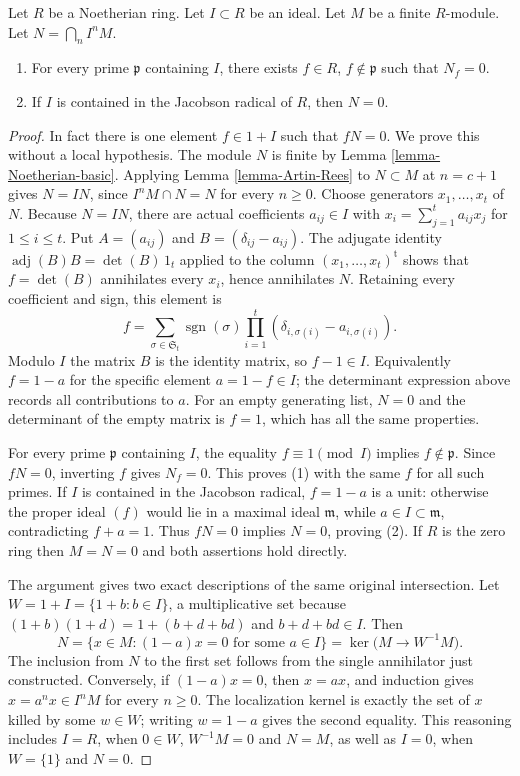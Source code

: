 \begin{lemma}
\label{lemma-intersection-powers-ideal-module}
Let $R$ be a Noetherian ring. Let $I \subset R$ be an ideal.
Let $M$ be a finite $R$-module. Let $N = \bigcap_n I^n M$.
\begin{enumerate}
\item For every prime $\mathfrak p$ containing $I$, there
exists $f \in R$, $f \not \in \mathfrak p$ such that $N_f = 0$.
\item If $I$ is contained in the Jacobson radical
of $R$, then $N = 0$.
\end{enumerate}
\end{lemma}

\begin{proof}
In fact there is one element $f\in1+I$ such that $fN=0$.
We prove this without a local hypothesis. The module $N$ is finite
by Lemma \ref{lemma-Noetherian-basic}. Applying
Lemma \ref{lemma-Artin-Rees} to $N\subset M$ at $n=c+1$
gives $N=IN$, since $I^nM\cap N=N$ for every $n\geq0$.
Choose generators $x_1,\ldots,x_t$ of $N$. Because $N=IN$,
there are actual coefficients $a_{ij}\in I$ with
$x_i=\sum_{j=1}^t a_{ij}x_j$ for $1\leq i\leq t$.
Put $A=(a_{ij})$ and $B=(\delta_{ij}-a_{ij})$.
The adjugate identity $\operatorname{adj}(B)B=\det(B)\,1_t$
applied to the column $(x_1,\ldots,x_t)^{\mathrm t}$ shows
that $f=\det(B)$ annihilates every $x_i$, hence annihilates $N$.
Retaining every coefficient and sign, this element is
$$
f=\sum_{\sigma\in\mathfrak S_t}\operatorname{sgn}(\sigma)
       \prod_{i=1}^t(\delta_{i,\sigma(i)}-a_{i,\sigma(i)}).
$$
Modulo $I$ the matrix $B$ is the identity matrix, so $f-1\in I$.
Equivalently $f=1-a$ for the specific element $a=1-f\in I$;
the determinant expression above records all contributions to $a$.
For an empty generating list, $N=0$ and the determinant of the
empty matrix is $f=1$, which has all the same properties.

For every prime $\mathfrak p$ containing $I$, the equality
$f\equiv1\pmod I$ implies $f\notin\mathfrak p$.
Since $fN=0$, inverting $f$ gives $N_f=0$. This proves (1)
with the same $f$ for all such primes. If $I$ is contained in the
Jacobson radical, $f=1-a$ is a unit: otherwise the proper ideal
$(f)$ would lie in a maximal ideal $\mathfrak m$, while
$a\in I\subset\mathfrak m$, contradicting $f+a=1$.
Thus $fN=0$ implies $N=0$, proving (2). If $R$ is the zero
ring then $M=N=0$ and both assertions hold directly.

The argument gives two exact descriptions of the same original
intersection. Let $W=1+I=\{1+b:b\in I\}$, a multiplicative
set because $(1+b)(1+d)=1+(b+d+bd)$ and $b+d+bd\in I$.
Then
$$
N=\{x\in M:(1-a)x=0\text{ for some }a\in I\}
=\ker\bigl(M\longrightarrow W^{-1}M\bigr).
$$
The inclusion from $N$ to the first set follows from the single
annihilator just constructed. Conversely, if $(1-a)x=0$,
then $x=ax$, and induction gives $x=a^nx\in I^nM$ for
every $n\geq0$. The localization kernel is exactly the set of
$x$ killed by some $w\in W$; writing $w=1-a$ gives the
second equality. This reasoning includes $I=R$, when $0\in W$,
$W^{-1}M=0$ and $N=M$, as well as $I=0$, when $W=\{1\}$
and $N=0$.


\end{proof}

